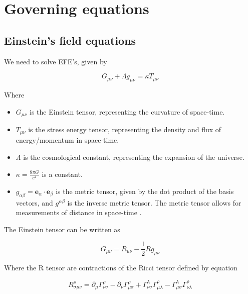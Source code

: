 \documentclass{article}
\begin{document}
\section{Governing equations}

\subsection{Einstein's field equations}

We need to solve EFE's, given by 

\begin{equation}
    G_{\mu \nu} + \Lambda g_{\mu \nu} = \kappa T_{\mu \nu}
\label{eq:EFE}
\end{equation}

Where 

\begin{itemize}
    \item $G_{\mu \nu}$ is the Einstein tensor, representing the curvature of space-time.
    
    \item $T_{\mu \nu}$ is the stress energy tensor, representing the density and flux of energy/momentum in space-time.
    
    \item $\Lambda$ is the cosmological constant, representing the expansion of the universe.
    
    \item $\kappa=\frac{8\pi G}{c^4}$ is a constant.
    
    \item $g_{\alpha \beta} = \boldsymbol{e}_\alpha \cdot \boldsymbol{e}_\beta$ is the metric tensor, given by the dot product of the basis vectors, and $g^{\alpha \beta}$ is the inverse metric tensor. The metric tensor allows for measurements of distance in space-time
    .
\end{itemize}

The Einstein tensor can be written as

\begin{equation}
    G_{\mu \nu } = R_{\mu \nu} - \frac{1}{2} R g_{\mu \nu}
\label{eq:Einstein tensor}
\end{equation}

Where the R tensor are contractions of the Ricci tensor defined by equation 

\begin{equation}
    R_{\sigma \mu \nu }^{\rho }=\partial_{\mu} \Gamma _{\nu \sigma }^{\rho }-\partial_\nu \Gamma _{\mu \sigma }^{\rho }+\Gamma _{\nu \sigma }^{\lambda } \Gamma _{\mu \lambda }^{\rho }-\Gamma _{\mu \sigma }^{\lambda } \Gamma _{\nu \lambda }^{\rho }
\label{eq:Riemann tesnor}
\end{equation}
\end{document}
